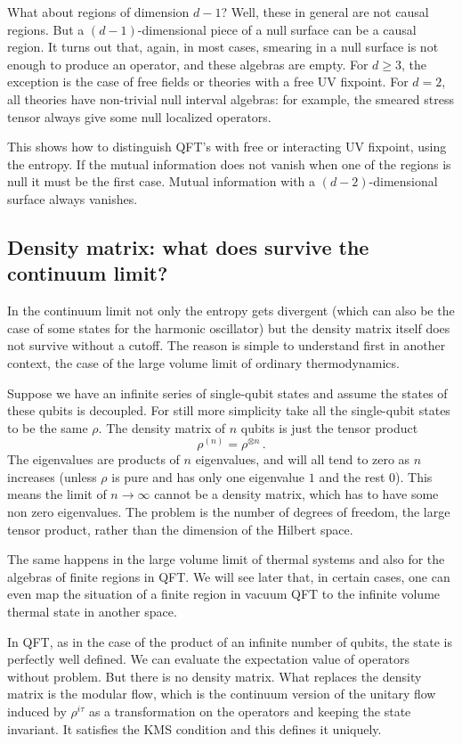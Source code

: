 \documentclass[12pt]{article}
\numberwithin{equation}{section}
\newcommand{\be}{\begin{equation}}
\newcommand{\ee}{\end{equation}}
\begin{document}
What about regions of dimension $d-1$? Well, these in general are not causal regions. But a $(d-1)$-dimensional piece of a null surface can be a causal region. It turns out that, again, in most cases, smearing in a null surface is not enough to produce an operator, and these algebras are empty. For $d\ge 3$, the exception is the case of free fields or theories with a free UV fixpoint. For $d=2$, all theories have non-trivial null interval algebras: for example, the smeared stress tensor always give some null localized operators.  

This shows how to distinguish QFT's with free or interacting UV fixpoint, using the entropy. If the mutual information does not vanish when one of the regions is null it must be the first case. Mutual information with a $(d-2)$-dimensional surface always vanishes. 

\subsection{Density matrix: what does survive the continuum limit?}
\label{density}
In the continuum limit not only the entropy gets divergent (which can also be the case of some states for the harmonic oscillator) but the density matrix itself does not survive without a cutoff. The reason is simple to understand first in another context, the case of the large volume limit of ordinary thermodynamics. 

Suppose we have an infinite series of single-qubit states and assume the states of these qubits is decoupled. For still more simplicity take all the single-qubit states to be the same $\rho$. The density matrix of $n$ qubits is just the tensor product
\be
\rho^{(n)}=\rho^{\otimes n}\,. 
\ee
The eigenvalues are products of $n$ eigenvalues, and will all tend to zero as $n$ increases (unless $\rho$ is pure and has only one eigenvalue $1$ and the rest $0$). This means the limit of $n\rightarrow \infty$ cannot be a density matrix, which has to have some non zero eigenvalues. The problem is the number of degrees of freedom, the large tensor product, rather than the dimension of the Hilbert space. 

The same happens in the large volume limit of thermal systems and also for the algebras of finite regions in QFT. We will see later that, in certain cases, one can even map the situation of a finite region in vacuum QFT to the infinite volume thermal state in another space. 

In QFT, as in the case of the product of an infinite number of qubits, the state is perfectly well defined. We can evaluate the expectation value of operators without problem. But there is no density matrix.     
What replaces the density matrix is the modular flow, which is the continuum version of the unitary flow induced by $\rho^{i\tau}$ as a transformation on the operators and keeping the state invariant. It satisfies the KMS condition and this defines it uniquely.  
\end{document}
